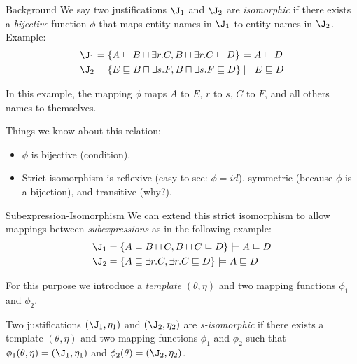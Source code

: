 \documentclass{beamer}
\begin{document}
\begin{frame}{Background}
We say two justifications $\J_{1}$ and $\J_{2}$ are \emph{isomorphic} if there exists a \emph{bijective} function $\phi$ that maps entity names in $\J_{1}$ to entity names in $\J_{2}$. Example:
\begin{align*}
\J_{1} &= \{ A \sqsubseteq B \sqcap \exists r.C, B \sqcap \exists r.C \sqsubseteq D\} \models A \sqsubseteq D\\
\J_{2} &= \{ E \sqsubseteq B \sqcap \exists s.F, B \sqcap \exists s.F  \sqsubseteq D\} \models E \sqsubseteq D
\end{align*}

In this example, the mapping $\phi$ maps $A$ to $E$, $r$ to $s$, $C$ to $F$, and all others names to themselves. 

Things we know about this relation:
\begin{itemize}
\item $\phi$ is bijective (condition).
\item Strict isomorphism is reflexive (easy to see: $\phi = id$), symmetric (because $\phi$ is a bijection), and transitive (why?).
\end{itemize}

\end{frame}

\begin{frame}{Subexpression-Isomorphism}
We can extend this strict isomorphism to allow mappings between \emph{subexpressions} as in the following example: 
\begin{align*}
\J_{1} &= \{A \sqsubseteq B \sqcap C, B \sqcap C \sqsubseteq D \} \models A \sqsubseteq D  \\ 
\J_{2} &= \{ A \sqsubseteq \exists r.C, \exists r.C  \sqsubseteq D\} \models A \sqsubseteq D
\end{align*}

For this purpose we introduce a \emph{template} $(\theta, \eta)$ and two mapping functions $\phi_1$ and $\phi_2$.

\begin{definition} Two justifications $(\J_{1}, \eta_1)$ and $(\J_{2}, \eta_2)$ are \emph{s-isomorphic} if there exists a template $(\theta, \eta)$ and two mapping functions $\phi_1$ and $\phi_2$ such that $\phi_{1}(\theta, \eta) = (\J_{1}, \eta_{1})$ and $\phi_{2}(\theta) = (\J_{2},\eta_2)$.
\end{definition}
\end{frame}
\end{document}
